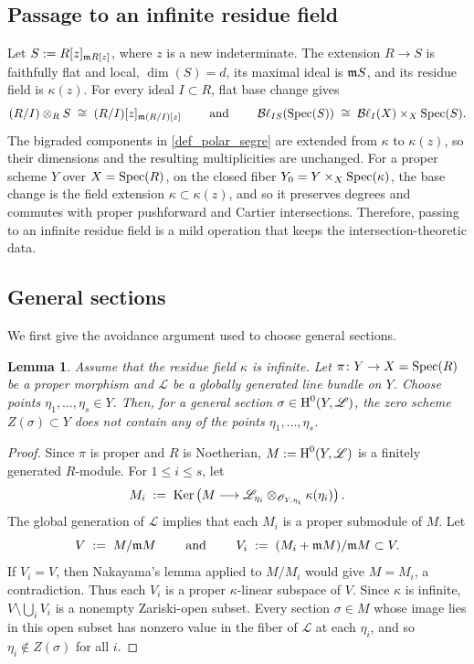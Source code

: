 \documentclass[a4paper, 11pt]{amsart}
\newcommand{\Bl}{{\mathcal{B}\ell}}
\newcommand{\mm}{{\normalfont\mathfrak{m}}}
\newcommand{\Ker}{\normalfont\text{Ker}}
\newcommand{\OO}{\mathscr{O}}
\newcommand{\LL}{\mathscr{L}}
\newcommand{\HH}{\normalfont\text{H}}
\newcommand{\Spec}{\normalfont\text{Spec}}
\newtheorem{lemma}[lemma]{Lemma}
\theoremstyle{definition}
\begin{document}
	
	\subsection{Passage to an infinite residue field}
	\label{subsec:infinite-residue-extension}
	
	Let $S:=R[z]_{\mm R[z]}$, where $z$ is a new indeterminate.
	The extension $R\to S$ is faithfully flat and
	local, $\dim(S)=d$, its maximal ideal is $\mm S$, and its residue field is $\kappa(z)$. 
	For every ideal $I \subset R$, flat base change gives
	$$
	(R/I) \otimes_R S \; \cong \; (R/I)[z]_{\mm(R/I)[z]} 
	\qquad \text{ and } \qquad
	\Bl_{IS}(\Spec(S)) \;\cong \; \Bl_I(X)\times_X\Spec(S).
	$$
	The bigraded components in \autoref{def_polar_segre} are extended from $\kappa$ to $\kappa(z)$, so their dimensions and the resulting multiplicities are unchanged. 
	For a proper scheme $Y$ over $X = \Spec(R)$, on the closed fiber $Y_0 = Y \times_{X} \Spec(\kappa)$, the base change is the field extension
	$\kappa\subset\kappa(z)$, and so it preserves degrees and commutes with proper pushforward and Cartier intersections.
	Therefore, passing to an infinite residue field is a mild operation that keeps the intersection-theoretic data.	
	
	\subsection{General sections}
	
	We first give the avoidance argument used to choose general sections.
	
	\begin{lemma}
		\label{lem:general-section-avoidance}
		Assume that the residue field $\kappa$ is infinite.  
		Let $\pi \colon Y \to X=\Spec(R)$ be a proper morphism and $\mathscr{L}$ be a globally generated line bundle on $Y$.
		Choose points $\eta_1,\ldots,\eta_s \in Y$.
		Then, for a general section $\sigma \in \HH^0(Y, \LL)$, the zero scheme $Z(\sigma) \subset Y$ does not contain any of the points $\eta_1,\ldots,\eta_s$.
	\end{lemma}
	\begin{proof}
		Since $\pi$ is proper and $R$ is Noetherian, $M:=\HH^0(Y,\LL)$ is a finitely generated $R$-module.
		For $1\leq i\leq s$, let
		$$
		M_i \;:=\; \Ker\left(M\longrightarrow
		\LL_{\eta_i}\otimes_{\OO_{Y,\eta_i}}\kappa(\eta_i)\right).
		$$
		The global generation of $\LL$ implies that each $M_i$ is a proper
		submodule of $M$.  Let
		$$
		V \; :=\; M/\mm M
		\qquad \text{ and } \qquad
		V_i \;:=\; (M_i+\mm M)/\mm M\subset V.
		$$
		If $V_i=V$, then Nakayama's lemma applied to $M/M_i$ would give
		$M=M_i$, a contradiction.  Thus each $V_i$ is a proper
		$\kappa$-linear subspace of $V$.  Since $\kappa$ is infinite,
		$V\setminus\bigcup_iV_i$ is a nonempty Zariski-open subset.
		Every section $\sigma\in M$ whose image lies in this open subset has nonzero value in the fiber of $\LL$ at each $\eta_i$, and so $\eta_i\notin Z(\sigma)$ for all $i$.
	\end{proof}
	
\end{document}
